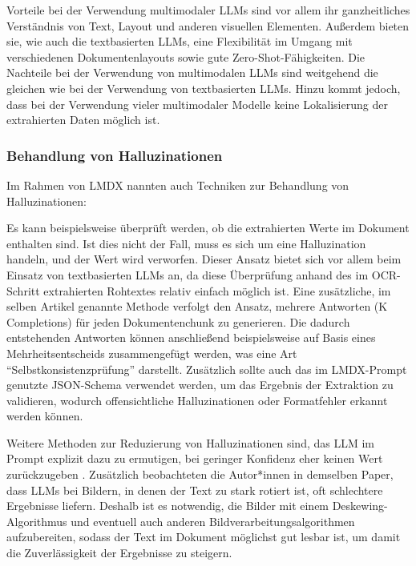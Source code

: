 Vorteile bei der Verwendung multimodaler \glspl{LLM} sind vor allem ihr ganzheitliches Verständnis von Text, Layout und anderen visuellen Elementen. Außerdem bieten sie, wie auch die textbasierten \glspl{LLM}, eine Flexibilität im Umgang mit verschiedenen Dokumentenlayouts sowie gute Zero-Shot-Fähigkeiten. Die Nachteile bei der Verwendung von multimodalen \glspl{LLM} sind weitgehend die gleichen wie bei der Verwendung von textbasierten \glspl{LLM}. Hinzu kommt jedoch, dass bei der Verwendung vieler multimodaler Modelle keine Lokalisierung der extrahierten Daten möglich ist.

\subsubsection{Behandlung von Halluzinationen}
\label{subsec:behandlung-von-halluzinationen}

Im Rahmen von \gls{LMDX} nannten \textcite{PerotVincent2024LLMD} auch Techniken zur Behandlung von Halluzinationen:

Es kann beispielsweise überprüft werden, ob die extrahierten Werte im Dokument enthalten sind. Ist dies nicht der Fall, muss es sich um eine Halluzination handeln, und der Wert wird verworfen. Dieser Ansatz bietet sich vor allem beim Einsatz von textbasierten \glspl{LLM} an, da diese Überprüfung anhand des im \gls{OCR}-Schritt extrahierten Rohtextes relativ einfach möglich ist. Eine zusätzliche, im selben Artikel genannte Methode verfolgt den Ansatz, mehrere Antworten (K Completions) für jeden Dokumentenchunk zu generieren. Die dadurch entstehenden Antworten können anschließend beispielsweise auf Basis eines Mehrheitsentscheids zusammengefügt werden, was eine Art ``Selbstkonsistenzprüfung'' darstellt. Zusätzlich sollte auch das im \gls{LMDX}-Prompt genutzte JSON-Schema verwendet werden, um das Ergebnis der Extraktion zu validieren, wodurch offensichtliche Halluzinationen oder Formatfehler erkannt werden können.

Weitere Methoden zur Reduzierung von Halluzinationen sind, das \gls{LLM} im Prompt explizit dazu zu ermutigen, bei geringer Konfidenz eher keinen Wert zurückzugeben \parencite{BiswasAnjanava2024RoSD}. Zusätzlich beobachteten die Autor*innen in demselben Paper, dass \glspl{LLM} bei Bildern, in denen der Text zu stark rotiert ist, oft schlechtere Ergebnisse liefern. Deshalb ist es notwendig, die Bilder mit einem Deskewing-Algorithmus und eventuell auch anderen Bildverarbeitungsalgorithmen aufzubereiten, sodass der Text im Dokument möglichst gut lesbar ist, um damit die Zuverlässigkeit der Ergebnisse zu steigern.

